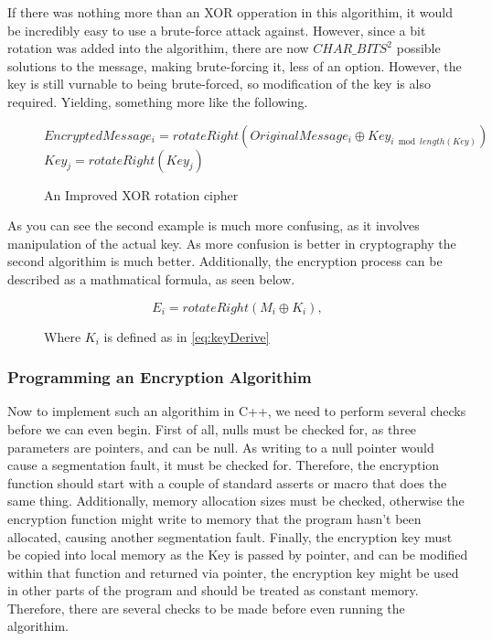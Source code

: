 \documentclass[12pt]{article}
\begin{document}
    If there was nothing more than an XOR opperation in this algorithim,
    it would be incredibly easy to use a brute-force attack against.
    However, since a bit rotation was added into the algorithim, there
    are now \(CHAR\_BITS^2\) possible solutions to the message, making
    brute-forcing it, less of an option. However, the key is still
    vurnable to being brute-forced, so modification of the key is also
    required. Yielding, something more like the following.
    
    \begin{figure}[h]
    \begin{algorithmic}[1]
      \State $EncryptedMessage_i =
             rotateRight(OriginalMessage_i \oplus Key_{i \bmod length(Key)})$
          \State $Key_j = rotateRight(Key_j)$
        \EndFor
      \EndIf
    \EndFor
    \end{algorithmic}
    \caption{An Improved XOR rotation cipher}
    \end{figure}
    
    As you can see the second example is much more confusing, as it involves
    manipulation of the actual key. As more confusion is better in 
    cryptography the second algorithim is much better.
    Additionally, the encryption process can be described as a mathmatical
    formula, as seen below.
    
    \begin{figure}[h]
    \begin{equation}
      \label{eq:Encrypt}
      E_{i} = rotateRight(M_{i} \oplus K_{i}),   
    \end{equation}
    \caption{Where \( K_i \) is defined as in \eqref{eq:keyDerive}}
    \end{figure}

    \subsubsection{Programming an Encryption Algorithim}
    Now to implement such an algorithim in C++, we need to perform several
    checks before we can even begin. First of all, nulls must be
    checked for, as three parameters are pointers, and can be null. As writing
    to a null pointer would cause a segmentation fault, it must be checked for.
    Therefore, the encryption function should start with a couple of standard
    asserts or macro that does the same thing. Additionally, memory allocation
    sizes must be checked, otherwise the encryption function might write to
    memory that the program hasn't  been allocated, causing another
    segmentation fault. Finally, the encryption key must be copied into
    local memory as the Key is passed by pointer, and can be modified within
    that function and returned via pointer, the encryption key might be used
    in other parts of the program and should be treated as constant memory.
    Therefore, there are several checks to be made before even running the
    algorithim.
    
\end{document}
